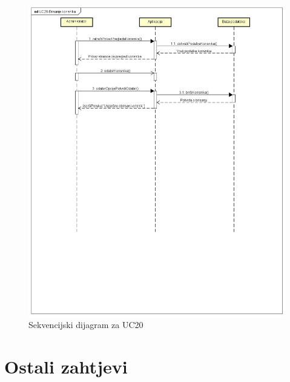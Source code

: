 				\begin{figure}[H]
						\includegraphics[width=\textwidth]{slike/uc20-1.PNG} 
						\caption{Sekvencijski dijagram za UC20}
						\label{fig:uc20}
				\end{figure}

				\eject
	
		\section{Ostali zahtjevi}
		
